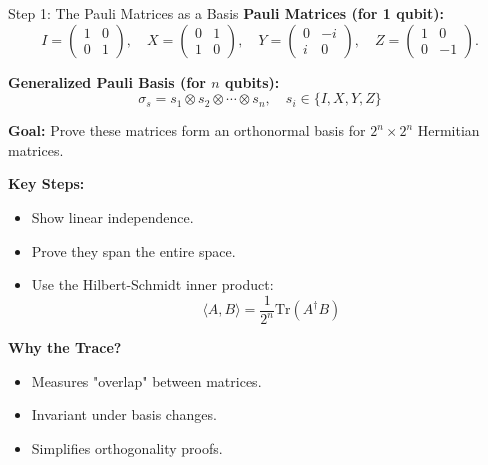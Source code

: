 \documentclass[aspectratio=169,xcolor=dvipsnames]{beamer}
\begin{document}
\begin{frame}{Step 1: The Pauli Matrices as a Basis}
\textbf{Pauli Matrices (for 1 qubit):}
\[
I = \begin{pmatrix} 1 & 0 \\ 0 & 1 \end{pmatrix}, \quad
X = \begin{pmatrix} 0 & 1 \\ 1 & 0 \end{pmatrix}, \quad
Y = \begin{pmatrix} 0 & -i \\ i & 0 \end{pmatrix}, \quad
Z = \begin{pmatrix} 1 & 0 \\ 0 & -1 \end{pmatrix}.
\]

\textbf{Generalized Pauli Basis (for \(n\) qubits):}
\[
\sigma_s = s_1 \otimes s_2 \otimes \cdots \otimes s_n, \quad s_i \in \{I, X, Y, Z\}
\]

\vspace{0.2cm}
\textbf{Goal:} Prove these matrices form an orthonormal basis for \(2^n \times 2^n\) Hermitian matrices.

\vspace{0.2cm}
\textbf{Key Steps:}
\begin{itemize}
    \item Show linear independence.
    \item Prove they span the entire space.
    \item Use the Hilbert-Schmidt inner product:
    \[
    \langle A, B \rangle = \frac{1}{2^n} \text{Tr}(A^\dagger B)
    \]
\end{itemize}

\vspace{0.2cm}
\textbf{Why the Trace?}
\begin{itemize}
    \item Measures "overlap" between matrices.
    \item Invariant under basis changes.
    \item Simplifies orthogonality proofs.
\end{itemize}
\end{frame}
\end{document}
